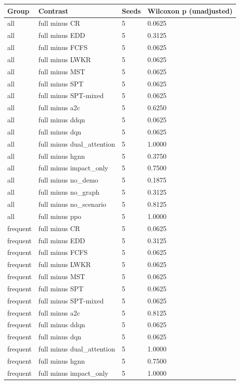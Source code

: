 \begin{tabular}{llll}
\toprule
Group & Contrast & Seeds & Wilcoxon p (unadjusted)\\
\midrule
all & full minus CR & 5 & 0.0625\\
all & full minus EDD & 5 & 0.3125\\
all & full minus FCFS & 5 & 0.0625\\
all & full minus LWKR & 5 & 0.0625\\
all & full minus MST & 5 & 0.0625\\
all & full minus SPT & 5 & 0.0625\\
all & full minus SPT-mixed & 5 & 0.0625\\
all & full minus a2c & 5 & 0.6250\\
all & full minus ddqn & 5 & 0.0625\\
all & full minus dqn & 5 & 0.0625\\
all & full minus dual\_attention & 5 & 1.0000\\
all & full minus hgnn & 5 & 0.3750\\
all & full minus impact\_only & 5 & 0.7500\\
all & full minus no\_demo & 5 & 0.1875\\
all & full minus no\_graph & 5 & 0.3125\\
all & full minus no\_scenario & 5 & 0.8125\\
all & full minus ppo & 5 & 1.0000\\
frequent & full minus CR & 5 & 0.0625\\
frequent & full minus EDD & 5 & 0.3125\\
frequent & full minus FCFS & 5 & 0.0625\\
frequent & full minus LWKR & 5 & 0.0625\\
frequent & full minus MST & 5 & 0.0625\\
frequent & full minus SPT & 5 & 0.0625\\
frequent & full minus SPT-mixed & 5 & 0.0625\\
frequent & full minus a2c & 5 & 0.8125\\
frequent & full minus ddqn & 5 & 0.0625\\
frequent & full minus dqn & 5 & 0.0625\\
frequent & full minus dual\_attention & 5 & 1.0000\\
frequent & full minus hgnn & 5 & 0.7500\\
frequent & full minus impact\_only & 5 & 1.0000\\

\end{tabular}
